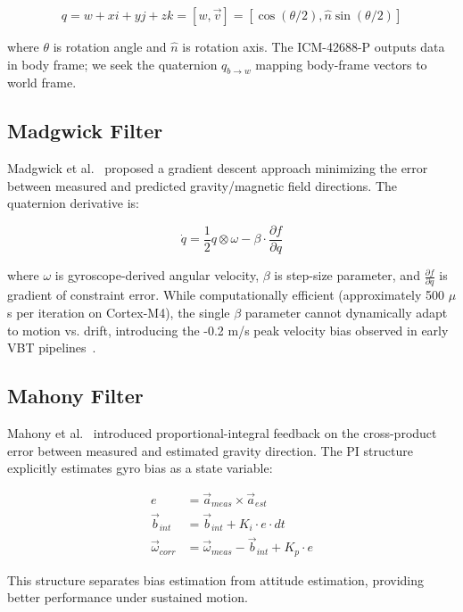 \begin{equation}
    q = w + xi + yj + zk = [w, \vec{v}] = [\cos(\theta/2), \hat{n}\sin(\theta/2)]
\end{equation}

where $\theta$ is rotation angle and $\hat{n}$ is rotation axis. The ICM-42688-P outputs data in body frame; we seek the quaternion $q_{b\to w}$ mapping body-frame vectors to world frame.

\subsection{Madgwick Filter}

Madgwick et al.~\cite{madgwick2010} proposed a gradient descent approach minimizing the error between measured and predicted gravity/magnetic field directions. The quaternion derivative is:

\begin{equation}
    \dot{q} = \frac{1}{2} q \otimes \omega - \beta \cdot \frac{\partial f}{\partial q}
\end{equation}

where $\omega$ is gyroscope-derived angular velocity, $\beta$ is step-size parameter, and $\frac{\partial f}{\partial q}$ is gradient of constraint error. While computationally efficient (approximately 500 $\mu$s per iteration on Cortex-M4), the single $\beta$ parameter cannot dynamically adapt to motion vs. drift, introducing the -0.2 m/s peak velocity bias observed in early VBT pipelines~\cite{laidig2021}.

\subsection{Mahony Filter}

Mahony et al.~\cite{mahony2008} introduced proportional-integral feedback on the cross-product error between measured and estimated gravity direction. The PI structure explicitly estimates gyro bias as a state variable:

\begin{align}
    e &= \vec{a}_{meas} \times \vec{a}_{est} \\
    \vec{b}_{int} &= \vec{b}_{int} + K_i \cdot e \cdot dt \\
    \vec{\omega}_{corr} &= \vec{\omega}_{meas} - \vec{b}_{int} + K_p \cdot e
\end{align}

This structure separates bias estimation from attitude estimation, providing better performance under sustained motion.


